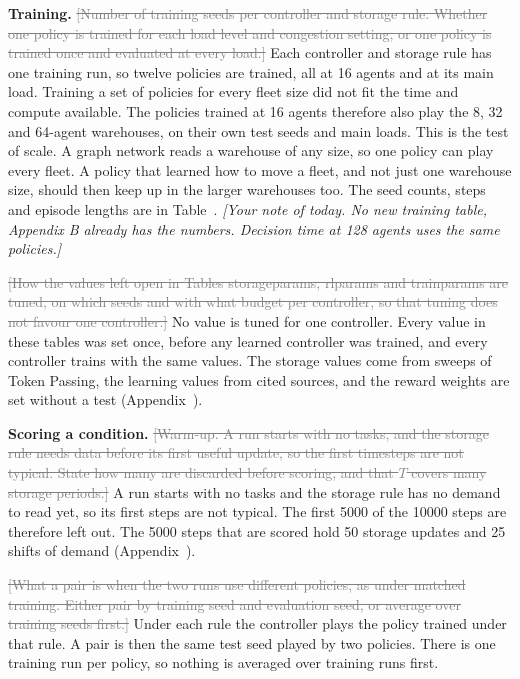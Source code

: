 \documentclass[11pt,a4paper]{article}
\newcommand{\new}[1]{\textcolor{newc}{#1}}
\newcommand{\old}[1]{\textcolor{gray}{\sout{#1}}}
\newcommand{\note}[1]{{\small\itshape [#1]}}
\newcommand{\lab}[1]{\textsf{\footnotesize\detokenize{#1}}}
\renewcommand{\ref}[1]{\lab{#1}}
\begin{document}
\textbf{Training.} \old{[Number of training seeds per controller and storage
rule. Whether one policy is trained for each load level and congestion
setting, or one policy is trained once and evaluated at every load.]}
\new{Each controller and storage rule has one training run, so twelve
policies are trained, all at 16 agents and at its main load. Training a set
of policies for every fleet size did not fit the time and compute
available. The policies trained at 16 agents therefore also play the 8, 32
and 64-agent warehouses, on their own test seeds and main loads. This is the
test of scale. A graph network reads a warehouse of any size, so one policy
can play every fleet. A policy that learned how to move a fleet, and not
just one warehouse size, should then keep up in the larger warehouses too.
The seed counts, steps and episode lengths are in
Table~\ref{tab:trainparams}.}
\note{Your note of today. No new training table, Appendix B already has the
numbers. Decision time at 128 agents uses the same policies.}

\old{[How the values left open in Tables storageparams, rlparams and
trainparams are tuned, on which seeds and with what budget per controller, so
that tuning does not favour one controller.]}
\new{No value is tuned for one controller. Every value in these tables was
set once, before any learned controller was trained, and every controller
trains with the same values. The storage values come from sweeps of Token
Passing, the learning values from cited sources, and the reward weights are
set without a test (Appendix~\ref{app:parameters}).}

\textbf{Scoring a condition.}
\old{[Warm-up. A run starts with no tasks, and the storage rule needs data
before its first useful update, so the first timesteps are not typical. State
how many are discarded before scoring, and that $T$ covers many storage
periods.]}
\new{A run starts with no tasks and the storage rule has no demand to read
yet, so its first steps are not typical. The first 5000 of the 10000 steps
are therefore left out. The 5000 steps that are scored hold 50 storage
updates and 25 shifts of demand (Appendix~\ref{app:horizon}).}

\old{[What a pair is when the two runs use different policies, as under
matched training. Either pair by training seed and evaluation seed, or average
over training seeds first.]}
\new{Under each rule the controller plays the policy trained under that rule.
A pair is then the same test seed played by two policies. There is one
training run per policy, so nothing is averaged over training runs first.}
\end{document}
